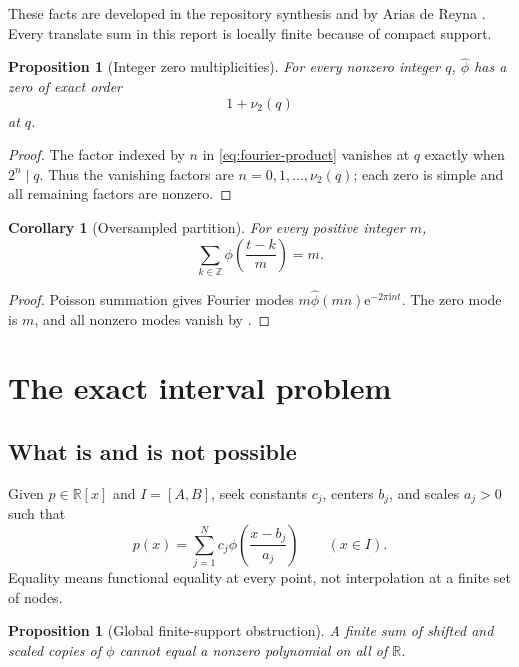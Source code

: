 \documentclass[11pt,oneside]{article}
\newtheorem{proposition}[theorem]{Proposition}
\newtheorem{corollary}[theorem]{Corollary}
\theoremstyle{definition}
\theoremstyle{remark}
\newcommand{\R}{\mathbb R}
\newcommand{\Z}{\mathbb Z}
\newcommand{\vtwo}{\nu_2}
\newcommand{\e}{\mathrm e}
\newcommand{\ii}{\mathrm i}
\begin{document}
These facts are developed in the repository synthesis and by Arias de Reyna
\cite{arias}.  Every translate sum in this report is locally finite because of
compact support.

\begin{proposition}[Integer zero multiplicities]
\label{prop:zeros}
For every nonzero integer \(q\), \(\widehat\phi\) has a zero of exact order
\[
 1+\vtwo(q)
\]
at \(q\).
\end{proposition}

\begin{proof}
The factor indexed by \(n\) in \eqref{eq:fourier-product} vanishes at \(q\)
exactly when \(2^n\mid q\).  Thus the vanishing factors are
\(n=0,1,\ldots,\vtwo(q)\); each zero is simple and all remaining factors are
nonzero.
\end{proof}

\begin{corollary}[Oversampled partition]
\label{cor:oversampled-partition}
For every positive integer \(m\),
\[
 \sum_{k\in\Z}\phi\!\left(\frac{t-k}{m}\right)=m.
\]
\end{corollary}

\begin{proof}
Poisson summation gives Fourier modes
\(m\widehat\phi(mn)\e^{-2\pi\ii nt}\).  The zero mode is \(m\), and all
nonzero modes vanish by .
\end{proof}

\section{The exact interval problem}

\subsection{What is and is not possible}

Given \(p\in\R[x]\) and \(I=[A,B]\), seek constants \(c_j\), centers \(b_j\),
and scales \(a_j>0\) such that
\begin{equation}
 p(x)=\sum_{j=1}^{N}c_j\phi\!\left(\frac{x-b_j}{a_j}\right)
 \qquad(x\in I).
 \label{eq:problem}
\end{equation}
Equality means functional equality at every point, not interpolation at a
finite set of nodes.

\begin{proposition}[Global finite-support obstruction]
\label{prop:global-obstruction}
A finite sum of shifted and scaled copies of \(\phi\) cannot equal a nonzero
polynomial on all of \(\R\).
\end{proposition}
\end{document}
